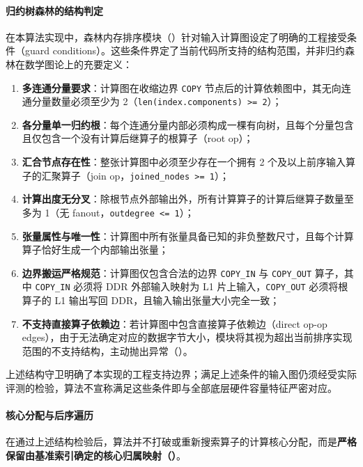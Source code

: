\documentclass[anonymous,withtoc]{gmcm2026}
\providecommand{\tightlist}{\setlength{\itemsep}{0pt}\setlength{\parskip}{0pt}}
\begin{document}
\paragraph{归约树森林的结构判定}

在本算法实现中，森林内存排序模块（\texttt{}）针对输入计算图设定了明确的工程接受条件（guard conditions）。这些条件界定了当前代码所支持的结构范围，并非归约森林在数学图论上的充要定义：

\begin{enumerate}
\def\labelenumi{\arabic{enumi}.}
\tightlist
\item
  \textbf{多连通分量要求}：计算图在收缩边界 \texttt{COPY} 节点后的计算依赖图中，其无向连通分量数量必须至少为 2（\texttt{len(index.components)\ \textgreater{}=\ 2}）；
\item
  \textbf{各分量单一归约根}：每个连通分量内部必须构成一棵有向树，且每个分量包含且仅包含一个没有计算后继算子的根算子（root op）；
\item
  \textbf{汇合节点存在性}：整张计算图中必须至少存在一个拥有 2 个及以上前序输入算子的汇聚算子（join op，\texttt{joined\_nodes\ \textgreater{}=\ 1}）；
\item
  \textbf{计算出度无分叉}：除根节点外部输出外，所有计算算子的计算后继算子数量至多为 1（无 fanout，\texttt{outdegree\ \textless{}=\ 1}）；
\item
  \textbf{张量属性与唯一性}：计算图中所有张量具备已知的非负整数尺寸，且每个计算算子恰好生成一个内部输出张量；
\item
  \textbf{边界搬运严格规范}：计算图仅包含合法的边界 \texttt{COPY\_IN} 与 \texttt{COPY\_OUT} 算子，其中 \texttt{COPY\_IN} 必须将 DDR 外部输入映射为 L1 片上输入，\texttt{COPY\_OUT} 必须将根算子的 L1 输出写回 DDR，且输入输出张量大小完全一致；
\item
  \textbf{不支持直接算子依赖边}：若计算图中包含直接算子依赖边（direct op-op edges），由于无法确定对应的数据字节大小，模块将其视为超出当前排序实现范围的不支持结构，主动抛出异常（\texttt{}）。
\end{enumerate}

上述结构守卫明确了本实现的工程支持边界；满足上述条件的输入图仍须经受实际评测的检验，算法不宣称满足这些条件即与全部底层硬件容量特征严密对应。

\paragraph{核心分配与后序遍历}

在通过上述结构检验后，算法并不打破或重新搜索算子的计算核心分配，而是\textbf{严格保留由基准索引确定的核心归属映射（\texttt{}）}。
\end{document}
